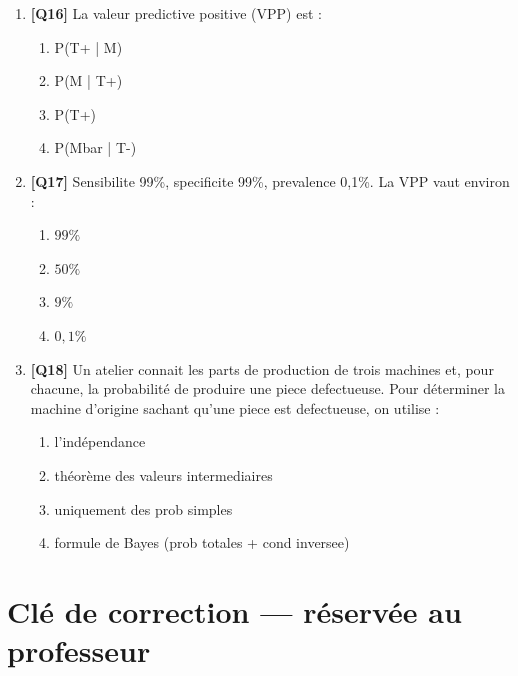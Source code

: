 \begin{enumerate}
\item \textbf{[Q16]} La valeur predictive positive (VPP) est :
  \begin{enumerate}[label=\Alph*.]
    \item P(T+ | M)
    \item P(M | T+)
    \item P(T+)
    \item P(Mbar | T-)
  \end{enumerate}

\item \textbf{[Q17]} Sensibilite 99\%, specificite 99\%, prevalence 0,1\%. La VPP vaut environ :
  \begin{enumerate}[label=\Alph*.]
    \item $99\%$
    \item $50\%$
    \item $9\%$
    \item $0{,}1\%$
  \end{enumerate}

\item \textbf{[Q18]} Un atelier connait les parts de production de trois machines et, pour chacune, la probabilité de produire une piece defectueuse. Pour déterminer la machine d'origine sachant qu'une piece est defectueuse, on utilise :
  \begin{enumerate}[label=\Alph*.]
    \item l'indépendance
    \item théorème des valeurs intermediaires
    \item uniquement des prob simples
    \item formule de Bayes (prob totales + cond inversee)
  \end{enumerate}

\end{enumerate}

\ifnxVersionProfesseur
\clearpage
\section*{Clé de correction — réservée au professeur}


